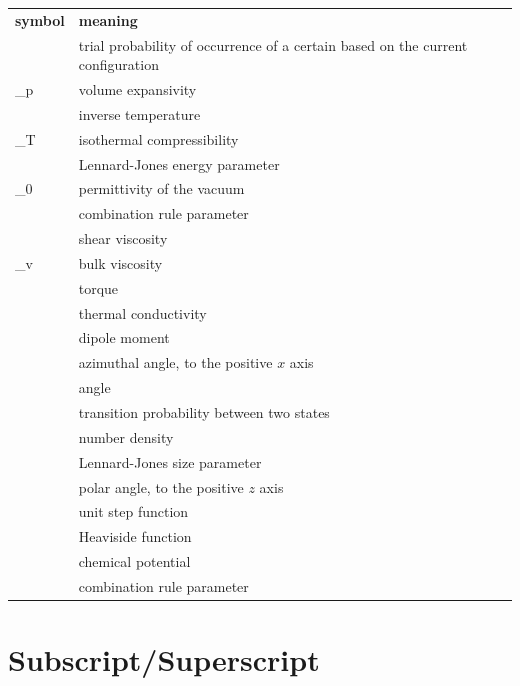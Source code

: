 {	\begin{longtable}{Z B r}
		\textbf{symbol} & \textbf{meaning}         &  \\
		\addlinespace
		\endhead
		\alpha & trial probability of occurrence of a certain based on the current configuration &  \\
		\alpha_p & volume expansivity &  \\
		\beta & inverse temperature &  \\
		\beta_T & isothermal compressibility &  \\
		\varepsilon & Lennard-Jones energy parameter &  \\
		\epsilon_0 & permittivity of the vacuum &  \\
		\eta  & combination rule parameter &  \\
		\eta  & shear viscosity &  \\
		\eta_v & bulk viscosity &  \\
		\Gamma & torque  &  \\
		\lambda & thermal conductivity &  \\
		\mu   & dipole moment  &  \\
		\phi  & azimuthal angle, to the positive $x$ axis  &  \\
		\varphi & angle &  \\
		\pi  &  transition probability between two states&  \\
		\rho &  number density  &  \\
		\sigma   &  Lennard-Jones size  parameter &  \\
		\theta & polar angle, to the positive $z$ axis &  \\
		\theta & unit step function &  \\
		\Theta & Heaviside function &  \\
		\tilde{\mu} & chemical potential  &  \\
		\xi   &  combination rule parameter &  \\
		
	\end{longtable}
	
	
	\section*{Subscript/Superscript}
	
}
